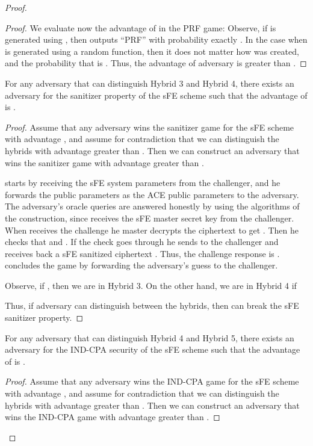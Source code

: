 \documentclass{llncs}
\begin{document}
\begin{proof}
\begin{proof}
We evaluate now the advantage of  in the PRF game: Observe, if  is generated using , then  outputs ``PRF'' with probability exactly . In the case when  is generated using a random function, then it does not matter how  was created, and the probability that  is . Thus, the advantage of adversary  is greater than .
\end{proof}


\begin{claim} \label{claim:ACE_nowrite_sFE_san}
For any adversary  that can distinguish Hybrid 3 and Hybrid 4, there exists an adversary  for the sanitizer property of the sFE scheme such that the advantage of  is 
.
\end{claim}

\begin{proof}
Assume that any adversary wins the sanitizer game for the sFE scheme with advantage , and assume for contradiction that we can distinguish the hybrids with advantage greater than . Then we can construct an adversary  that wins the sanitizer game with advantage greater than .

 starts by receiving the sFE system parameters from the challenger, and he forwards the public parameters as the ACE public parameters to the adversary. 
The adversary's oracle queries are answered honestly by using the algorithms of the construction, since  receives the sFE master secret key from the challenger.
When  receives the challenge  he master decrypts the ciphertext to get . Then he checks that  and . If the check goes through he sends  to the challenger and receives back a sFE sanitized ciphertext . Thus, the challenge response is . 
 concludes the game by forwarding the adversary's guess  to the challenger.

Observe, if , then we are in Hybrid 3. On the other hand, we are in Hybrid 4 if 

Thus, if adversary  can distinguish between the hybrids, then  can break the sFE sanitizer property. 
\end{proof}


\begin{claim} \label{claim:ACE_nowrite_sFE_IND-CPA}
For any adversary  that can distinguish Hybrid 4 and Hybrid 5, there exists an adversary  for the IND-CPA security of the sFE scheme such that the advantage of  is 
.
\end{claim}

\begin{proof}
Assume that any adversary wins the IND-CPA game for the sFE scheme with advantage , and assume for contradiction that we can distinguish the hybrids with advantage greater than . Then we can construct an adversary  that wins the IND-CPA game with advantage greater than .


\end{proof}
\end{proof}
\end{document}
